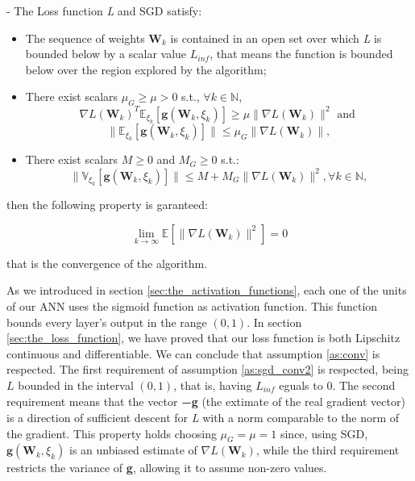 		\begin{asu} - \label{as:sgd_conv2}
				The Loss function \textit{L} and SGD satisfy:

				\begin{itemize}
					\item The sequence of weights ${\textbf{W}_k}$ is contained in an open set over which \textit{L} is bounded below by a scalar value $\textit{L}_{inf}$, that means the function is bounded below over the region explored by the algorithm;
					\item There exist scalars $\mu_G \geq \mu > 0 $ s.t., $\forall k \in \mathbb{N}$,
						\begin{equation}
							\nabla\textit{L}(\textbf{W}_k)^T\mathbb{E}_{\xi_k}[\textbf{g}(\textbf{W}_k,\xi_k)] \geq \mu \|\nabla\textit{L}(\textbf{W}_k)\|^2 \text{ and }
						\end{equation}
						\begin{equation}
							\|\mathbb{E}_{\xi_k}[\textbf{g}(\textbf{W}_k,\xi_k)]\|\leq \mu_G \|\nabla\textit{L}(\textbf{W}_k)\|,
						\end{equation}
					\item There exist scalars $M \geq 0 $ and $M_G \geq 0 $ s.t.:
						\begin{equation}
							\|\mathbb{V}_{\xi_k}[\textbf{g}(\textbf{W}_k,\xi_k)]\|\leq M + M_G\|\nabla\textit{L}(\textbf{W}_k)\|^2, \forall  k \in \mathbb{N},
						\end{equation}
				\end{itemize}

		\end{asu}

		then the following property is garanteed:

			\begin{equation*}
			     \lim_{k\to\infty}\mathbb{E}[\|\nabla\textit{L}(\textbf{W}_k)\|^2] = 0
			\end{equation*}

		that is the convergence of the algorithm.

		As we introduced in section \ref{sec:the_activation_functions}, each one of the units of our ANN uses
		the sigmoid function as activation function. This function bounds every layer's output in the range
		$(0, 1)$. In section \ref{sec:the_loss_function}, we have proved that our loss function is both
		Lipschitz continuous and differentiable. We can conclude that assumption \ref{as:conv} is respected.
		The first requirement of assumption \ref{as:sgd_conv2} is respected, being $L$ bounded in the
		interval $(0, 1)$, that is, having $L_{\mathit{inf}}$ eguals to $0$. The second requirement
		means that the vector \textbf{−g} (the extimate of the real gradient vector) is a direction of
		sufficient descent for \textit{L} with a norm comparable to the norm of the gradient. This property holds choosing $\mu_G = \mu = 1$ since, using SGD, $\textbf{g}(\textbf{W}_k, \xi_k)$ is an unbiased estimate of $\nabla L(\textbf{W}_k)$, while the
		third requirement restricts the variance of \textbf{g}, allowing it to assume non-zero values.

